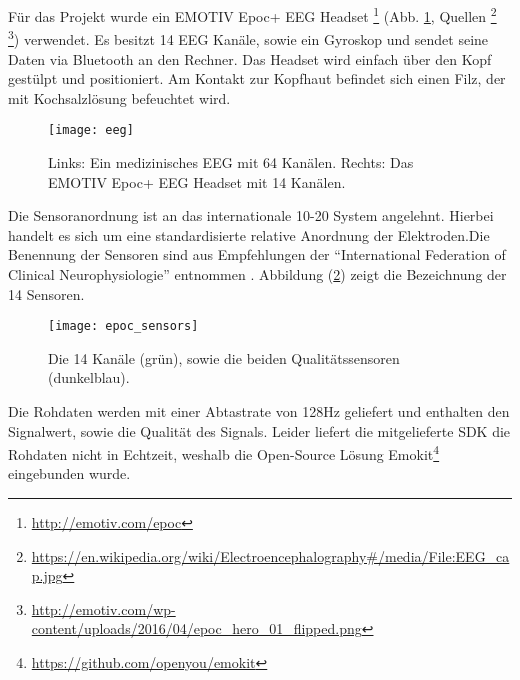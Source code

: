\label{chap:eeg}
Für das Projekt wurde ein EMOTIV Epoc+ EEG Headset \footnote{\url{http://emotiv.com/epoc}} (Abb. \ref{fig:eeg}, Quellen \footnote{\url{https://en.wikipedia.org/wiki/Electroencephalography\#/media/File:EEG_cap.jpg}} \footnote{\url{http://emotiv.com/wp-content/uploads/2016/04/epoc_hero_01_flipped.png}}) verwendet. Es besitzt 14 EEG Kanäle, sowie ein Gyroskop und sendet seine Daten via Bluetooth an den Rechner. Das Headset wird einfach über den Kopf gestülpt und positioniert. Am Kontakt zur Kopfhaut befindet sich einen Filz, der mit Kochsalzlösung befeuchtet wird.

\begin{figure}[h] 
  \begin{center}
    \texttt{[image: eeg]}
    \caption[Medzinisches EEG / EMOTIV Epoc+]{Links: Ein medizinisches EEG mit 64 Kanälen. Rechts: Das EMOTIV Epoc+ EEG Headset mit 14 Kanälen.\label{fig:eeg}}
  \end{center}
\end{figure}

Die Sensoranordnung ist an das internationale 10-20 System \cite{10-20}  angelehnt. Hierbei handelt es sich um eine standardisierte relative Anordnung der Elektroden.Die Benennung der Sensoren  sind aus Empfehlungen der "`International Federation of Clinical Neurophysiologie"' entnommen \cite{ifcn}. Abbildung (\ref{fig:epoc_sensors}) zeigt die Bezeichnung der 14 Sensoren. 

\begin{figure}[h] 
  \begin{center}
    \texttt{[image: epoc\_sensors]}
    \caption[EEG Sensoranordnung]{Die 14 Kanäle (grün), sowie die beiden Qualitätssensoren (dunkelblau).\label{fig:epoc_sensors}}
  \end{center}
\end{figure}

Die Rohdaten werden mit einer Abtastrate von 128Hz geliefert und enthalten  den Signalwert, sowie die Qualität des Signals. Leider liefert die mitgelieferte SDK die Rohdaten nicht in Echtzeit, weshalb die Open-Source Lösung Emokit\footnote{\url{https://github.com/openyou/emokit}} eingebunden wurde.
